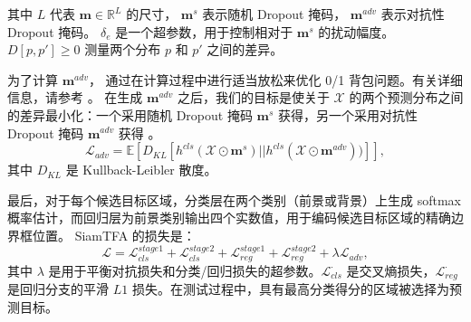 其中 $L$ 代表 $\mathbf{m} \in \mathbb R^L$ 的尺寸，
$\mathbf{m}^s$ 表示随机 Dropout 掩码， $\mathbf{m}^{adv}$ 表示对抗性 Dropout 掩码。
$\delta_{e}$ 是一个超参数，用于控制相对于 $\mathbf{m}^{s}$ \cite{lee2019drop} 的扰动幅度。
$D[p, p'] \geq 0$ 测量两个分布 $p$ 和 $p'$ 之间的差异。

为了计算 $\mathbf{m}^{adv}$，\cite{park2018adversarial} 通过在计算过程中进行适当放松来优化 0/1 背包问题。有关详细信息，请参考 \cite{park2018adversarial}。
在生成 $\mathbf{m}^{adv}$ 之后，我们的目标是使关于 $\mathcal{X}$ 的两个预测分布之间的差异最小化：一个采用随机 Dropout 掩码 $\mathbf{m}^{s}$ 获得，另一个采用对抗性 Dropout 掩码 $\mathbf{m}^{adv}$ 获得 \cite{lee2019drop}。
\begin{equation}
    \mathcal{L}_{adv} = \mathbb E[D_{KL}[h^{cls}(\mathcal{X} \odot\mathbf{m}^{s})||h^{cls}(\mathcal{X} \odot\mathbf{m}^{adv}))]],
\end{equation}
其中 $D_{KL}$ 是 Kullback-Leibler 散度。

最后，对于每个候选目标区域，分类层在两个类别（前景或背景）上生成 softmax 概率估计，而回归层为前景类别输出四个实数值，用于编码候选目标区域的精确边界框位置。
SiamTFA 的损失是：
\begin{equation}
\mathcal{L} = \mathcal{L}_{cls}^{stage1} + \mathcal{L}_{cls}^{stage2} + \mathcal{L}_{reg}^{stage1}+\mathcal{L}_{reg}^{stage2} +  \lambda \mathcal{L}_{adv},
\end{equation}
其中 $\lambda$ 是用于平衡对抗损失和分类/回归损失的超参数。$\mathcal{L}_{cls}^{\cdot}$ 是交叉熵损失，$\mathcal{L}_{reg}^{\cdot}$ 是回归分支的平滑 $L1$ 损失。在测试过程中，具有最高分类得分的区域被选择为预测目标。

